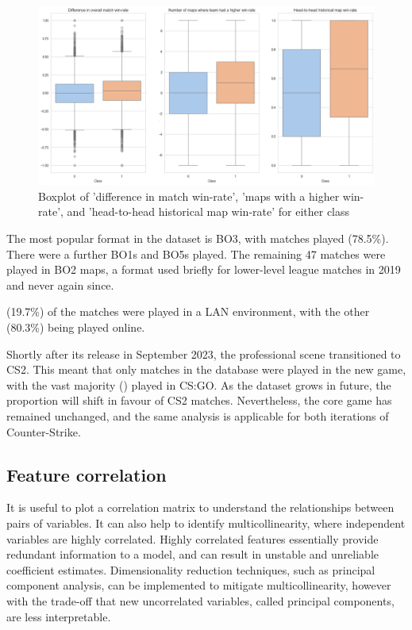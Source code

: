 \begin{figure}[h]
	\centering
	\begin{adjustbox}{center}
		\includegraphics[width=1.2\textwidth]{Figures/class-box-new-2.png}
	\end{adjustbox}
	\caption{Boxplot of 'difference in match win-rate', 'maps with a higher win-rate', and 'head-to-head historical map win-rate' for either class}
	\label{fig:win_rate_class_dist}
\end{figure}

The most popular format in the dataset is BO3, with \matchesBoThree{} matches played (78.5\%). There were a further \matchesBoOne{} BO1s and \matchesBoFive{} BO5s played. The remaining 47 matches were played in BO2 maps, a format used briefly for lower-level league matches in 2019 and never again since. 

\matchesLAN{} (19.7\%) of the matches were played in a LAN environment, with the other \matchesOnline{} (80.3\%) being played online. 

Shortly after its release in September 2023, the professional scene transitioned to CS2. This meant that only \matchesCSTwo{} matches in the database were played in the new game, with the vast majority (\matchesCSGO{}) played in CS:GO. As the dataset grows in future, the proportion will shift in favour of CS2 matches. Nevertheless, the core game has remained unchanged, and the same analysis is applicable for both iterations of Counter-Strike.

\newpage

\subsection{Feature correlation}

It is useful to plot a correlation matrix to understand the relationships between pairs of variables. It can also help to identify multicollinearity, where independent variables are highly correlated. Highly correlated features essentially provide redundant information to a model, and can result in unstable and unreliable coefficient estimates. Dimensionality reduction techniques, such as principal component analysis, can be implemented to mitigate multicollinearity, however with the trade-off that new uncorrelated variables, called principal components, are less interpretable.

